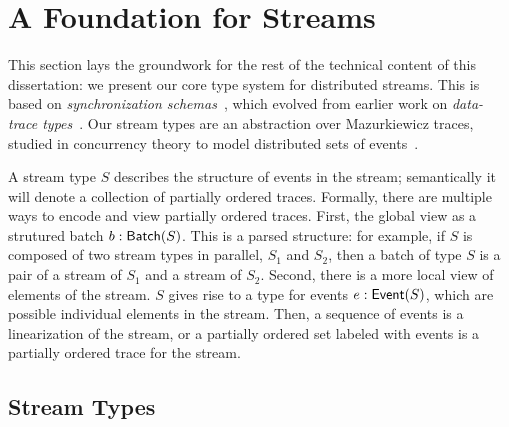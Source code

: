 \chapter{A Foundation for Streams}
\label{cha:foundation}


This section lays the groundwork for the rest of the technical content of this dissertation: we present our core type system for distributed streams. This is based on \emph{synchronization schemas}~, which evolved from earlier work on \emph{data-trace types}~.
Our stream types are an abstraction over Mazurkiewicz traces, studied in concurrency theory to model distributed sets of events~\cite{mazurkiewicz1986trace,DiekertR1995}.

A stream type $S$ describes the structure of events in the stream;
semantically it will denote a collection of partially ordered traces.
Formally, there are multiple ways to encode and view partially ordered traces.
First, the global view as a strutured batch $b: \mathsf{Batch}({S})$.
This is a parsed structure: for example, if $S$ is composed of two stream types in parallel, $S_1$ and $S_2$, then a batch of type $S$ is a pair of a stream of $S_1$ and a stream of $S_2$.
Second, there is a more local view of elements of the stream.
$S$ gives rise to a type for events $e: \mathsf{Event}({S})$,
which are possible individual elements in the stream.
Then, a sequence of events is a linearization of the stream,
or a partially ordered set labeled with events is a partially ordered trace
for the stream.

\section{Stream Types}


